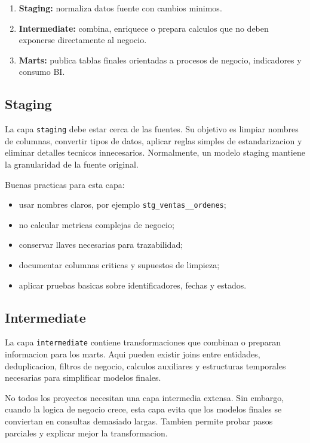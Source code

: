 \documentclass[12pt]{article}
\begin{document}
\begin{enumerate}[label=\textbf{C\arabic*.}, leftmargin=*]
\item \textbf{Staging:} normaliza datos fuente con cambios minimos.
\item \textbf{Intermediate:} combina, enriquece o prepara calculos que no deben exponerse directamente al negocio.
\item \textbf{Marts:} publica tablas finales orientadas a procesos de negocio, indicadores y consumo BI.
\end{enumerate}

\subsection{Staging}
La capa \texttt{staging} debe estar cerca de las fuentes. Su objetivo es limpiar nombres de columnas, convertir tipos de datos, aplicar reglas simples de estandarizacion y eliminar detalles tecnicos innecesarios. Normalmente, un modelo staging mantiene la granularidad de la fuente original.

Buenas practicas para esta capa:

\begin{itemize}[leftmargin=*]
\item usar nombres claros, por ejemplo \texttt{stg\_ventas\_\_ordenes};
\item no calcular metricas complejas de negocio;
\item conservar llaves necesarias para trazabilidad;
\item documentar columnas criticas y supuestos de limpieza;
\item aplicar pruebas basicas sobre identificadores, fechas y estados.
\end{itemize}

\subsection{Intermediate}
La capa \texttt{intermediate} contiene transformaciones que combinan o preparan informacion para los marts. Aqui pueden existir joins entre entidades, deduplicacion, filtros de negocio, calculos auxiliares y estructuras temporales necesarias para simplificar modelos finales.

No todos los proyectos necesitan una capa intermedia extensa. Sin embargo, cuando la logica de negocio crece, esta capa evita que los modelos finales se conviertan en consultas demasiado largas. Tambien permite probar pasos parciales y explicar mejor la transformacion.
\end{document}
